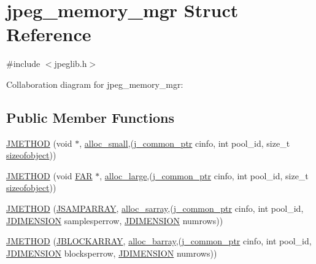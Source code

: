 \hypertarget{structjpeg__memory__mgr}{}\section{jpeg\+\_\+memory\+\_\+mgr Struct Reference}
\label{structjpeg__memory__mgr}


{\ttfamily \#include $<$jpeglib.\+h$>$}



Collaboration diagram for jpeg\+\_\+memory\+\_\+mgr\+:
\subsection*{Public Member Functions}
\begin{DoxyCompactItemize}
\item 
\mbox{\hyperlink{structjpeg__memory__mgr_a9372ad24444dda23175cc9203105911c}{J\+M\+E\+T\+H\+OD}} (void $\ast$, \mbox{\hyperlink{jmemmgr_8c_a6e4421c67636e6f167ced68315f70c2b}{alloc\+\_\+small}},(\mbox{\hyperlink{jpeglib_8h_a1a177ab705cefea8f30ec31a48e62650}{j\+\_\+common\+\_\+ptr}} cinfo, int pool\+\_\+id, size\+\_\+t \mbox{\hyperlink{jmemsys_8h_a473c898cf03a1563dc17fdafd08ddc30}{sizeofobject}}))
\item 
\mbox{\hyperlink{structjpeg__memory__mgr_a130f6dbc700cc045bdbe35beff2cb326}{J\+M\+E\+T\+H\+OD}} (void \mbox{\hyperlink{jmorecfg_8h_aef060b3456fdcc093a7210a762d5f2ed}{F\+AR}} $\ast$, \mbox{\hyperlink{jmemmgr_8c_af69578de2938175b723191af0bf5b128}{alloc\+\_\+large}},(\mbox{\hyperlink{jpeglib_8h_a1a177ab705cefea8f30ec31a48e62650}{j\+\_\+common\+\_\+ptr}} cinfo, int pool\+\_\+id, size\+\_\+t \mbox{\hyperlink{jmemsys_8h_a473c898cf03a1563dc17fdafd08ddc30}{sizeofobject}}))
\item 
\mbox{\hyperlink{structjpeg__memory__mgr_a3fdd2e1dfdc089fd61f17b608c0263f2}{J\+M\+E\+T\+H\+OD}} (\mbox{\hyperlink{jpeglib_8h_ac9d5d1b829ed51769db69a37271a7e91}{J\+S\+A\+M\+P\+A\+R\+R\+AY}}, \mbox{\hyperlink{jmemmgr_8c_a2f3c8a1efa7c23b98670fbdd351c5f41}{alloc\+\_\+sarray}},(\mbox{\hyperlink{jpeglib_8h_a1a177ab705cefea8f30ec31a48e62650}{j\+\_\+common\+\_\+ptr}} cinfo, int pool\+\_\+id, \mbox{\hyperlink{jmorecfg_8h_a04ed4674f6f1d0d50ec241531e38274f}{J\+D\+I\+M\+E\+N\+S\+I\+ON}} samplesperrow, \mbox{\hyperlink{jmorecfg_8h_a04ed4674f6f1d0d50ec241531e38274f}{J\+D\+I\+M\+E\+N\+S\+I\+ON}} numrows))
\item 
\mbox{\hyperlink{structjpeg__memory__mgr_aefc8abe884dab5648c1e4e7ada2e2e18}{J\+M\+E\+T\+H\+OD}} (\mbox{\hyperlink{jpeglib_8h_ab03cfeb937b60b9b73ca6e3cf935af49}{J\+B\+L\+O\+C\+K\+A\+R\+R\+AY}}, \mbox{\hyperlink{jmemmgr_8c_afc851a6f36c0a1904c52ac8f06ab1928}{alloc\+\_\+barray}},(\mbox{\hyperlink{jpeglib_8h_a1a177ab705cefea8f30ec31a48e62650}{j\+\_\+common\+\_\+ptr}} cinfo, int pool\+\_\+id, \mbox{\hyperlink{jmorecfg_8h_a04ed4674f6f1d0d50ec241531e38274f}{J\+D\+I\+M\+E\+N\+S\+I\+ON}} blocksperrow, \mbox{\hyperlink{jmorecfg_8h_a04ed4674f6f1d0d50ec241531e38274f}{J\+D\+I\+M\+E\+N\+S\+I\+ON}} numrows))

\end{DoxyCompactItemize}

